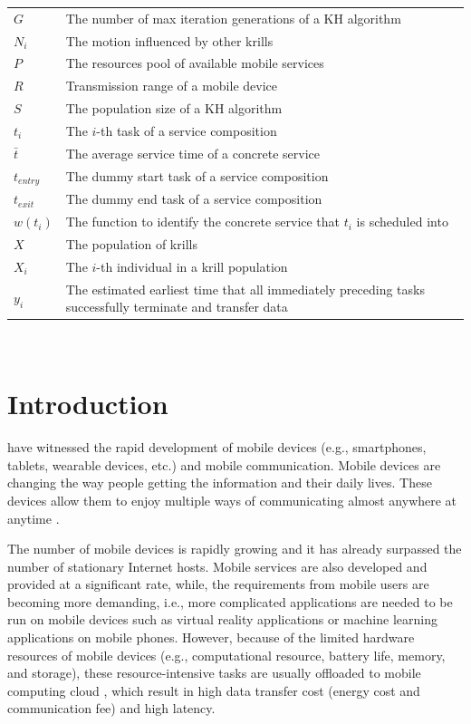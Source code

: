 \documentclass[journal]{IEEEtran}
\begin{document}
\begin{tabular}{@{} l p{7.36cm} }
$G$           &   The number of max iteration generations of a KH algorithm \\
$N_i$         &   The motion influenced by other krills \\
$P$           &   The resources pool of available mobile services \\
$R$           &   Transmission range of a mobile device \\
$S$           &   The population size of a KH algorithm \\
$t_i$         &   The $i$-th task of a service composition \\
$\bar{t}$     &   The average service time of a concrete service \\
$t_{entry}$   &   The dummy start task of a service composition \\
$t_{exit}$    &   The dummy end task of a service composition \\
$w(t_i)$      &   The function to identify the concrete service that $t_i$ is scheduled into \\
$X$           &   The population of krills \\
$X_i$         &   The $i$-th individual in a krill population \\
$y_i$         &   The estimated earliest time that all immediately preceding tasks successfully terminate and transfer data \\
\end{tabular}
~\\

\IEEEpeerreviewmaketitle

\section{Introduction}

 have witnessed the rapid development of mobile devices (e.g., smartphones, tablets, wearable devices, etc.) and mobile communication.
Mobile devices are changing the way people getting the information and their daily lives.
These devices allow them to enjoy multiple ways of communicating almost anywhere at anytime \cite{satyanarayanan2010mobile}.

The number of mobile devices is rapidly growing and it has already surpassed the number of stationary Internet hosts.
Mobile services are also developed and provided at a significant rate, while, the requirements from mobile users are becoming more demanding, i.e., more complicated applications are needed to be run on mobile devices such as virtual reality applications \cite{bastug2017toward} or machine learning applications \cite{abadi2016TensorFlow} on mobile phones. However, because of the limited hardware resources of mobile devices (e.g., computational resource, battery life, memory, and storage), these resource-intensive tasks are usually offloaded to mobile computing cloud \cite{dinh2013survey}, which result in high data transfer cost (energy cost and communication fee) and high latency.
\end{document}
